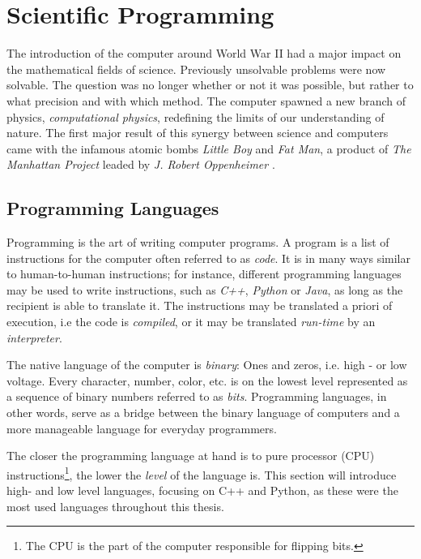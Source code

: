 \chapter{Scientific Programming}
\label{ch:SciProg}

The introduction of the computer around World War II had a major impact on the mathematical fields of science. Previously unsolvable problems were now  solvable. The question was no longer whether or not it was possible, but rather to what precision and with which method. The computer spawned a new branch of physics, \textit{computational physics}, redefining the limits of our understanding of nature. The first major result of this synergy between science and computers came with the infamous atomic bombs \textit{Little Boy} and \textit{Fat Man}, a product of \textit{The Manhattan Project} leaded by \textit{J. Robert Oppenheimer} \cite{supermen}. 

\section{Programming Languages}

Programming is the art of writing computer programs. A program is a list of instructions for the computer often referred to as \textit{code}. It is in many ways similar to human-to-human instructions; for instance, different programming languages may be used to write instructions, such as \textit{C++}, \textit{Python} or \textit{Java}, as long as the recipient is able to translate it. The instructions may be translated a priori of execution, i.e the code is \textit{compiled}, or it may be translated \textit{run-time} by an \textit{interpreter}. 

The native language of the computer is \textit{binary}: Ones and zeros, i.e. high - or low voltage. Every character, number, color, etc. is on the lowest level represented as a sequence of binary numbers referred to as \textit{bits}. Programming languages, in other words, serve as a bridge between the binary language of computers and a more manageable language for everyday programmers.

The closer the programming language at hand is to pure processor (CPU) instructions\footnote{The CPU is the part of the computer responsible for flipping bits.}, the lower the \textit{level} of the language is. This section will introduce high- and low level languages, focusing on C++ and Python, as these were the most used languages throughout this thesis.   

